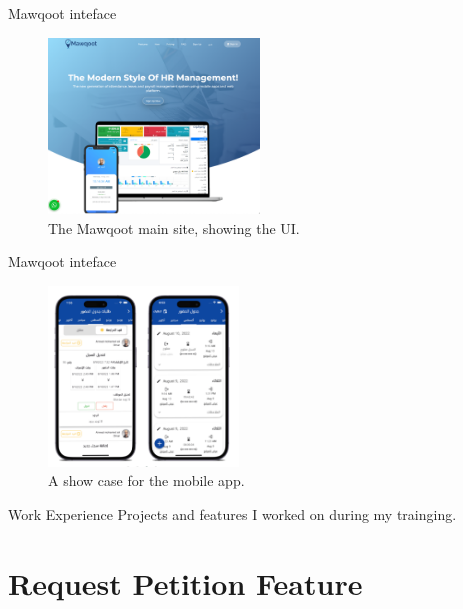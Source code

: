 \documentclass{loyola-beamer}
\begin{document}
\begin{frame}{Mawqoot inteface}
  \begin{figure}
    \begin{center}
      \includegraphics[width=0.5\textwidth]{figures/site.png}
    \end{center}
    \caption{The Mawqoot main site, showing the UI.}
  \end{figure}
\end{frame}

\begin{frame}{Mawqoot inteface}
  \begin{figure}
    \begin{center}
      \includegraphics[width=0.45\textwidth]{figures/mobile.png}
    \end{center}
    \caption{A show case for the mobile app.}
  \end{figure}
  
\end{frame}



\begin{titleframe}{Work Experience}
  Projects and features I worked on during my trainging.
\end{titleframe}

\section{Request Petition Feature}
\end{document}
